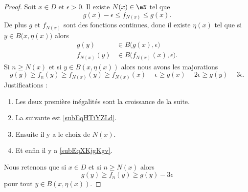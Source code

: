 \begin{proof}
    Soit \( x\in D\) et \( \epsilon>0\). Il existe \( N(x)\in \eN\) tel que
    \begin{equation}
        g(x)-\epsilon\leq f_{N(x)}\leq g(x).
    \end{equation}
    De plus \( g\) et \( f_{N(x)}\) sont des fonctions continues, donc il existe \( \eta(x)\) tel que si \( y\in B\big( x,\eta(x) \big)\) alors
    \begin{subequations}
        \begin{align}
            g(y)&\in B\big( g(x),\epsilon \big) \label{subEqXKjgKgv}\\
            f_{N(x)}(y)&\in B\big( f_{N(x)}(x),\epsilon \big)   \label{subEqHTiYZLd}.
        \end{align}
    \end{subequations}
    Si \( n\geq N(x)\) et si \( y\in B(x,\eta(x))\) alors nous avons les majorations
    \begin{equation}
            g(y)\geq f_n(y)
            \geq f_{N(x)}(y)
            \geq f_{N(x)}(x)-\epsilon
            \geq g(x)-2\epsilon
            \geq g(y)-3\epsilon.
    \end{equation}
    Justifications :
    \begin{multicols}{2}
        \begin{enumerate}
            \item
                Les deux première inégalités sont la croissance de la suite.
            \item
                La suivante est \eqref{subEqHTiYZLd}.
            \item
                Ensuite il y a le choix de \( N(x)\).
            \item
                Et enfin il y a \eqref{subEqXKjgKgv}.
        \end{enumerate}
    \end{multicols}
    Nous retenons que si \( x\in D\) et si \( n\geq N(x)\) alors
    \begin{equation}    \label{EqJCMktdj}
        g(y)\geq f_n(y)\geq g(y)-3\epsilon
    \end{equation}
    pour tout \( y\in B(x,\eta(x))\).


\end{proof}
